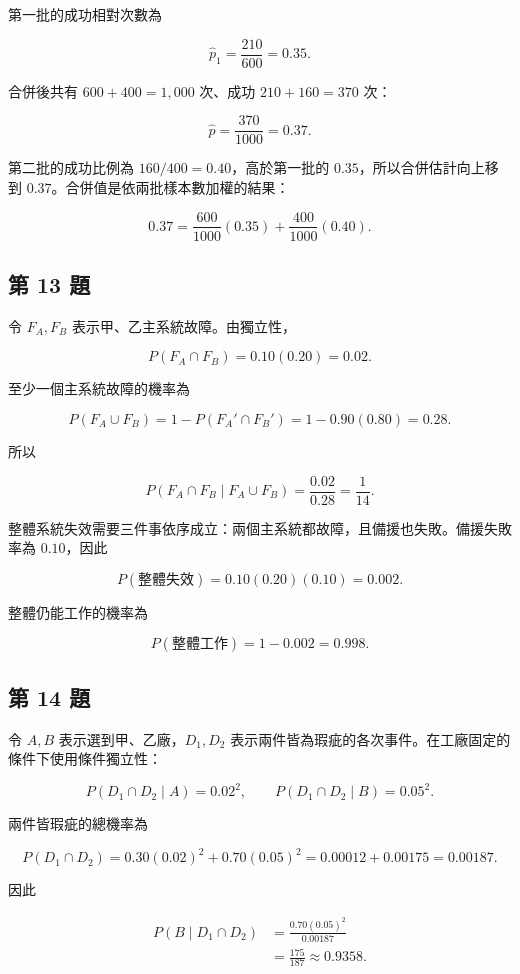 \documentclass[11pt,a4paper]{article}
\begin{document}
第一批的成功相對次數為

\[
\hat p_1=\frac{210}{600}=\boxed{0.35}.
\]

合併後共有 \(600+400=1{,}000\) 次、成功 \(210+160=370\) 次：

\[
\hat p=\frac{370}{1000}=\boxed{0.37}.
\]

第二批的成功比例為 \(160/400=0.40\)，高於第一批的 \(0.35\)，所以合併估計向上移到 \(0.37\)。合併值是依兩批樣本數加權的結果：

\[
0.37=\frac{600}{1000}(0.35)+\frac{400}{1000}(0.40).
\]

\subsection{第 13 題}\label{ux7b2c-13-ux984c}

令 \(F_A,F_B\) 表示甲、乙主系統故障。由獨立性，

\[
P(F_A\cap F_B)=0.10(0.20)=0.02.
\]

至少一個主系統故障的機率為

\[
P(F_A\cup F_B)=1-P(F_A'\cap F_B')
=1-0.90(0.80)=0.28.
\]

所以

\[
P(F_A\cap F_B\mid F_A\cup F_B)
=\frac{0.02}{0.28}
=\boxed{\frac1{14}}.
\]

整體系統失效需要三件事依序成立：兩個主系統都故障，且備援也失敗。備援失敗率為 \(0.10\)，因此

\[
P(\text{整體失效})=0.10(0.20)(0.10)=0.002.
\]

整體仍能工作的機率為

\[
P(\text{整體工作})=1-0.002=\boxed{0.998}.
\]

\subsection{第 14 題}\label{ux7b2c-14-ux984c}

令 \(A,B\) 表示選到甲、乙廠，\(D_1,D_2\) 表示兩件皆為瑕疵的各次事件。在工廠固定的條件下使用條件獨立性：

\[
P(D_1\cap D_2\mid A)=0.02^2,
\qquad
P(D_1\cap D_2\mid B)=0.05^2.
\]

兩件皆瑕疵的總機率為

\[
P(D_1\cap D_2)
=0.30(0.02)^2+0.70(0.05)^2
=0.00012+0.00175
=0.00187.
\]

因此

\[
\begin{aligned}
P(B\mid D_1\cap D_2)
&=\frac{0.70(0.05)^2}{0.00187}\\
&=\boxed{\frac{175}{187}\approx0.9358}.
\end{aligned}
\]
\end{document}
